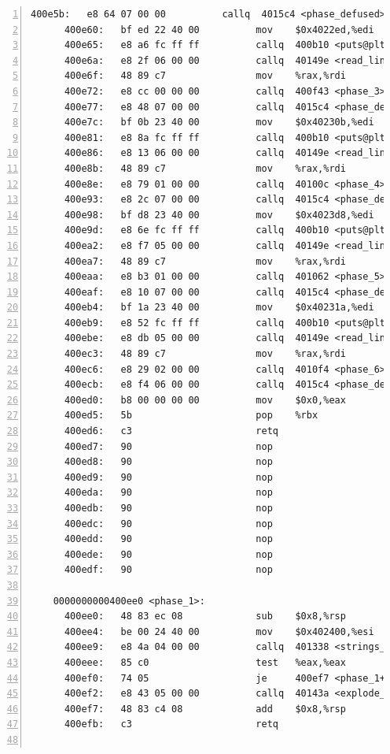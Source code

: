 \documentclass{article}
\begin{document}
\begin{lstlisting}[title = bomb的反汇编代码及部分注释, xleftmargin = 2em,xrightmargin = 2em, aboveskip = 1em, numbers = left, basicstyle=\scriptsize\ttfamily, numberstyle=\scriptsize]
      400e5b:	e8 64 07 00 00       	callq  4015c4 <phase_defused>
      400e60:	bf ed 22 40 00       	mov    $0x4022ed,%edi
      400e65:	e8 a6 fc ff ff       	callq  400b10 <puts@plt>
      400e6a:	e8 2f 06 00 00       	callq  40149e <read_line>
      400e6f:	48 89 c7             	mov    %rax,%rdi
      400e72:	e8 cc 00 00 00       	callq  400f43 <phase_3>
      400e77:	e8 48 07 00 00       	callq  4015c4 <phase_defused>
      400e7c:	bf 0b 23 40 00       	mov    $0x40230b,%edi
      400e81:	e8 8a fc ff ff       	callq  400b10 <puts@plt>
      400e86:	e8 13 06 00 00       	callq  40149e <read_line>
      400e8b:	48 89 c7             	mov    %rax,%rdi
      400e8e:	e8 79 01 00 00       	callq  40100c <phase_4>
      400e93:	e8 2c 07 00 00       	callq  4015c4 <phase_defused>
      400e98:	bf d8 23 40 00       	mov    $0x4023d8,%edi
      400e9d:	e8 6e fc ff ff       	callq  400b10 <puts@plt>
      400ea2:	e8 f7 05 00 00       	callq  40149e <read_line>
      400ea7:	48 89 c7             	mov    %rax,%rdi
      400eaa:	e8 b3 01 00 00       	callq  401062 <phase_5>
      400eaf:	e8 10 07 00 00       	callq  4015c4 <phase_defused>
      400eb4:	bf 1a 23 40 00       	mov    $0x40231a,%edi
      400eb9:	e8 52 fc ff ff       	callq  400b10 <puts@plt>
      400ebe:	e8 db 05 00 00       	callq  40149e <read_line>
      400ec3:	48 89 c7             	mov    %rax,%rdi
      400ec6:	e8 29 02 00 00       	callq  4010f4 <phase_6>
      400ecb:	e8 f4 06 00 00       	callq  4015c4 <phase_defused>
      400ed0:	b8 00 00 00 00       	mov    $0x0,%eax
      400ed5:	5b                   	pop    %rbx
      400ed6:	c3                   	retq   
      400ed7:	90                   	nop
      400ed8:	90                   	nop
      400ed9:	90                   	nop
      400eda:	90                   	nop
      400edb:	90                   	nop
      400edc:	90                   	nop
      400edd:	90                   	nop
      400ede:	90                   	nop
      400edf:	90                   	nop
    
    0000000000400ee0 <phase_1>:
      400ee0:	48 83 ec 08          	sub    $0x8,%rsp					; %rsp -= 0x8;
      400ee4:	be 00 24 40 00       	mov    $0x402400,%esi				; %esi = 0x402400;
      400ee9:	e8 4a 04 00 00       	callq  401338 <strings_not_equal>	; strings_not_equal(...);
      400eee:	85 c0                	test   %eax,%eax					; if (%eax != 0)
      400ef0:	74 05                	je     400ef7 <phase_1+0x17>		;     goto #351;
      400ef2:	e8 43 05 00 00       	callq  40143a <explode_bomb>		; explode_bomb(...)
      400ef7:	48 83 c4 08          	add    $0x8,%rsp					; %rsp += 8;
      400efb:	c3                   	retq								; return;
    

\end{lstlisting}
\end{document}
